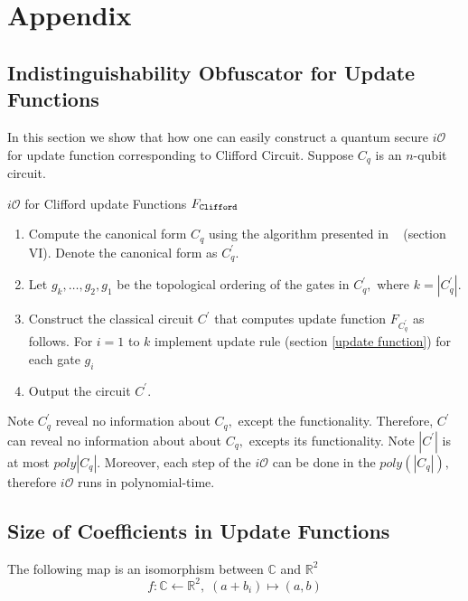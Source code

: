 \section{Appendix}
\label{sec:appendix}
 \subsection{Indistinguishability Obfuscator for Update Functions}
 \label{sec: iO-clifford-functions}
 In this section we show that how one can easily construct a quantum secure $i\mathcal{O}$ for update function corresponding to Clifford Circuit. Suppose $C_q$ is an $n$-qubit circuit.
\begin{algorithm}[H]
  \caption{$i\mathcal{O}$ for Clifford update Functions $F_{\tt Clifford}$}
  \begin{enumerate}
  \item Compute the canonical form $C_q$ using the algorithm presented in ~\cite{AG04} (section VI). Denote the canonical form as $C_q^\prime.$
  \item Let $g_k, \ldots,g_2,g_1$ be the topological ordering of the gates in $C_q^\prime,$ where $k=|C_q^\prime|.$
  \item Construct the classical circuit $C^\prime$ that computes update function $F_{C_q^\prime}$ as follows. For $i=1$ to $k$ implement update rule (section \ref{update function})  for each gate $g_i$
  \item Output the circuit $C^\prime.$
  \end{enumerate}
\end{algorithm}
%
\noindent Note $C_q^\prime$ reveal no information about $C_q,$ except the functionality. Therefore, $C^\prime$ can reveal no information about about $C_q,$ excepts its functionality. Note $|C^\prime|$ is at most $poly|C_q|.$ Moreover, each step of the $i\mathcal{O}$ can be done in the $poly(|C_q|),$ therefore $i\mathcal{O}$ runs in polynomial-time.



 \subsection{Size of Coefficients in Update Functions}
 \label{coeff:size}
The following map is an isomorphism between $\mathbb{C}$ and $\mathbb{R}^2$
 \begin{equation}
  \label{size:map:real-complex)}
  f:\mathbb{C}\leftarrow \mathbb{R}^2, \; (a+b_i)\mapsto (a,b)
\end{equation}

